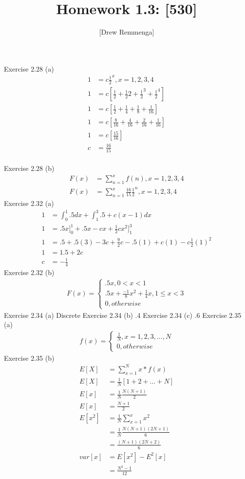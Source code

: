 \documentclass[10pt, oneside]{article}
\title{Homework 1.3: [530]}
\author{[Drew Remmenga]}
\begin{document}
\maketitle
\pagebreak
Exercise 2.28 (a)
\begin{align}
1&=c\frac{1}{2}^{x}, x=1,2,3,4\\
1&=c[\frac{1}{2} +\frac{1}{2}{2}+\frac{1}{2}^{3} + \frac{1}{2}^{4}]\\
1&=c[\frac{1}{2}+\frac{1}{4}+\frac{1}{8}+\frac{1}{16}]\\
1&=c[\frac{8}{16}+\frac{4}{16}+\frac{2}{16}+\frac{1}{16}]\\
1&=c[\frac{15}{16}]\\
c&=\frac{16}{15}\\
\end{align}
\pagebreak

Exercise 2.28 (b)
\begin{align}
F(x) &= \sum_{n=1}^{x} f(n), x = 1,2,3,4\\
F(x)& = \sum_{n=1}^{x} \frac{16}{15}\frac{1}{2}^{n}, x=1,2,3,4
\end{align}
\clearpage
\pagebreak
Exercise 2.32 (a)
\begin{align*}
1&=\int_{0}^{1} .5dx +\int_{1}^{3} .5+c(x-1)dx\\
1&=.5x]_{0}^{1} +.5x-cx+\frac{1}{2}cx^{2}]_{1}^{3}\\
1&=.5+.5(3)-3c+\frac{9}{2}c -.5(1)+c(1)-c\frac{1}{2}(1)^{2}\\
1&=1.5+2c \\
c&=-\frac{1}{4}
\end{align*}
\clearpage
\pagebreak
Exercise 2.32 (b)
\begin{align*}
F(x)= \begin{cases} .5x, 0 <x<1 \\ .5x+\frac{-1}{8}x^{2}+\frac{1}{4}x, 1 \leq x < 3 \\ 0, otherwise \end{cases}
\end{align*}
\clearpage
\pagebreak
Exercise 2.34 (a)
Discrete
\clearpage
\pagebreak
Exercise 2.34 (b)
.4
\clearpage
\pagebreak
Exercise 2.34 (c)
.6
\clearpage
\pagebreak
Exercise 2.35 (a)
\begin{align*}
f(x) = \begin{cases} \frac{1}{N}, x = 1,2,3,...,N \\
0, otherwise 
\end{cases}
\end{align*}
\clearpage
\pagebreak
Exercise 2.35 (b)
\begin{align}
E[X] &= \sum_{x=1}^{N} x * f(x) \\
E[X] &= \frac{1}{N} [1+2+...+N]\\
E[x] &= \frac{1}{N} \frac{N(N+1)}{2} \\
E[x] &= \frac{N+1}{2} \\
E[x^{2}] &= \frac{1}{N} \sum_{x=1}^{x} x^{2} \\
& = \frac{1}{N} \frac{N(N+1)(2N+1)}{6} \\
& = \frac{(N+1)(2N+2)}{6} \\
var[x] & = E[x^{2}] - E^{2} [x] \\
& = \frac{N^{2} -1}{12} \\
\end{align}
\end{document}
